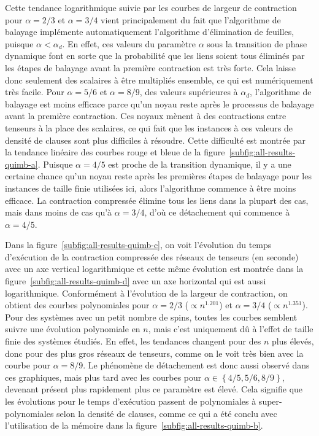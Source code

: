 Cette tendance logarithmique suivie par les courbes de largeur de contraction pour $\alpha = 2/3$ et $\alpha = 3/4$ vient principalement du fait que l'algorithme de balayage implémente automatiquement l'algorithme d'élimination de feuilles, puisque $\alpha < \alpha_d$.
En effet, ces valeurs du paramètre $\alpha$ sous la transition de phase dynamique font en sorte que la probabilité que les liens soient tous éliminés par les étapes de balayage avant la première contraction est très forte.
Cela laisse donc seulement des scalaires à être multipliés ensemble, ce qui est numériquement très facile.
Pour $\alpha = 5/6$ et $\alpha = 8/9$, des valeurs supérieures à $\alpha_d$, l'algorithme de balayage est moins efficace parce qu'un noyau reste après le processus de balayage avant la première contraction.
Ces noyaux mènent à des contractions entre tenseurs à la place des scalaires, ce qui fait que les instances à ces valeurs de densité de clauses sont plus difficiles à résoudre.
Cette difficulté est montrée par la tendance linéaire des courbes rouge et bleue de la figure~\ref{subfig:all-results-quimb-a}.
Puisque $\alpha = 4/5$ est proche de la transition dynamique, il y a une certaine chance qu'un noyau reste après les premières étapes de balayage pour les instances de taille finie utilisées ici, alors l'algorithme commence à être moins efficace.
La contraction compressée élimine tous les liens dans la plupart des cas, mais dans moins de cas qu'à $\alpha = 3/4$, d'où ce détachement qui commence à $\alpha = 4/5$.

Dans la figure~\ref{subfig:all-results-quimb-c}, on voit l'évolution du temps d'exécution de la contraction compressée des réseaux de tenseurs (en seconde) avec un axe vertical logarithmique et cette même évolution est montrée dans la figure~\ref{subfig:all-results-quimb-d} avec un axe horizontal qui est aussi logarithmique.
Conformément à l'évolution de la largeur de contraction, on obtient des courbes polynomiales pour $\alpha = 2/3$ ($\propto n^{1.201}$) et $\alpha=3/4$ ($\propto n^{1.351}$).
Pour des systèmes avec un petit nombre de spins, toutes les courbes semblent suivre une évolution polynomiale en $n$, mais c'est uniquement dû à l'effet de taille finie des systèmes étudiés.
En effet, les tendances changent pour des $n$ plus élevés, donc pour des plus gros réseaux de tenseurs, comme on le voit très bien avec la courbe pour $\alpha = 8/9$.
Le phénomène de détachement est donc aussi observé dans ces graphiques, mais plus tard avec les courbes pour $\alpha \in \left\{4/5, 5/6, 8/9 \right\}$, devenant présent plus rapidement plus ce paramètre est élevé.
Cela signifie que les évolutions pour le temps d'exécution passent de polynomiales à super-polynomiales selon la densité de clauses, comme ce qui a été conclu avec l'utilisation de la mémoire dans la figure~\ref{subfig:all-results-quimb-b}.

